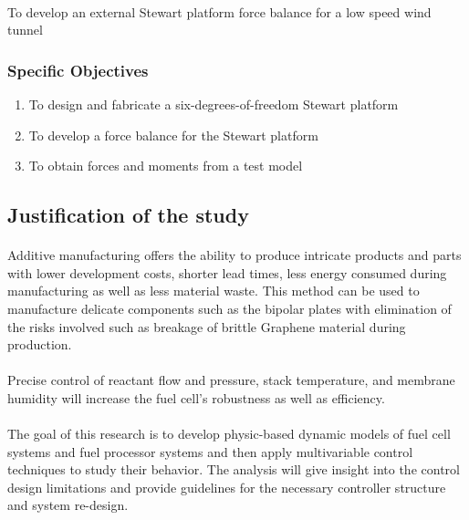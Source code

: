 \paragraph{} To develop an external Stewart platform force balance for a low speed wind tunnel 
\subsubsection{Specific Objectives}
\begin{enumerate}
\item To design and fabricate a six-degrees-of-freedom Stewart platform
\item To develop a force balance for the Stewart platform
\item To obtain forces and moments from a test model
\end{enumerate}
\subsection{Justification of the study}
\paragraph{}Additive manufacturing offers the ability to produce intricate products and parts with lower development costs, shorter lead times, less energy consumed during manufacturing as well as less material waste. This method can be used to manufacture delicate components such as the bipolar plates with elimination of the risks involved such as breakage of brittle Graphene material during production.     
\paragraph{}Precise control of reactant flow and pressure, stack temperature, and membrane humidity will increase the fuel cell’s robustness as well as efficiency.
\paragraph{}The goal of this research is to develop physic-based dynamic models of fuel cell systems and fuel processor systems and then apply multivariable control techniques to study their behavior. The analysis will give insight into the control design limitations and provide guidelines for the necessary controller structure and system re-design.
